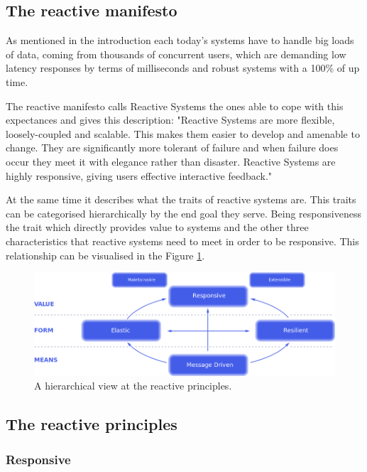\documentclass[../main.tex]{subfiles}
\begin{document}
\subsection{The reactive manifesto} As mentioned in the introduction each
today's systems have to handle big loads of data, coming from thousands of
concurrent users, which are demanding low latency responses by terms of
milliseconds and robust systems with a 100\% of up time.

The reactive manifesto \autocite{2014TheManifesto} calls Reactive Systems the
ones able to cope with this expectances and gives this description: "Reactive
Systems are more flexible, loosely-coupled and scalable. This makes them easier
to develop and amenable to change. They are significantly more tolerant of
failure and when failure does occur they meet it with elegance rather than
disaster. Reactive Systems are highly responsive, giving users effective
interactive feedback."


At the same time it describes what the traits of reactive systems are. This
traits can be categorised hierarchically by the end goal they serve. Being
responsiveness the trait which directly provides value to systems and the other
three characteristics that reactive systems need to meet in order to be
responsive. This relationship can be visualised in the Figure
\ref{fig:reactive}.

\begin{figure}[ht] \centering
\includegraphics[width=\textwidth]{images/reactive-traits.png}
    \caption{A hierarchical view at the reactive principles.}
    \label{fig:reactive}
\end{figure}

\subsection{The reactive principles}
\subsubsection{Responsive}
\end{document}
